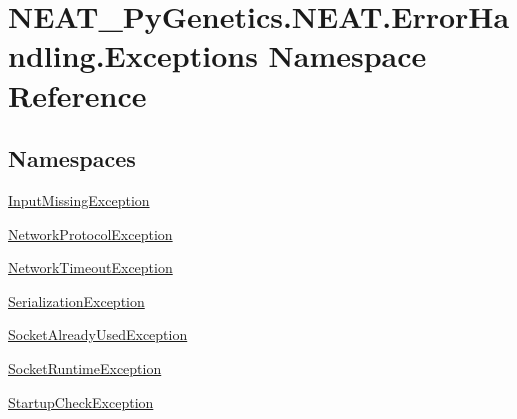 \hypertarget{namespaceNEAT__PyGenetics_1_1NEAT_1_1ErrorHandling_1_1Exceptions}{}\section{N\+E\+A\+T\+\_\+\+Py\+Genetics.\+N\+E\+A\+T.\+Error\+Handling.\+Exceptions Namespace Reference}
\label{namespaceNEAT__PyGenetics_1_1NEAT_1_1ErrorHandling_1_1Exceptions}
\subsection*{Namespaces}
\begin{DoxyCompactItemize}
\item 
 \hyperlink{namespaceNEAT__PyGenetics_1_1NEAT_1_1ErrorHandling_1_1Exceptions_1_1InputMissingException}{Input\+Missing\+Exception}
\item 
 \hyperlink{namespaceNEAT__PyGenetics_1_1NEAT_1_1ErrorHandling_1_1Exceptions_1_1NetworkProtocolException}{Network\+Protocol\+Exception}
\item 
 \hyperlink{namespaceNEAT__PyGenetics_1_1NEAT_1_1ErrorHandling_1_1Exceptions_1_1NetworkTimeoutException}{Network\+Timeout\+Exception}
\item 
 \hyperlink{namespaceNEAT__PyGenetics_1_1NEAT_1_1ErrorHandling_1_1Exceptions_1_1SerializationException}{Serialization\+Exception}
\item 
 \hyperlink{namespaceNEAT__PyGenetics_1_1NEAT_1_1ErrorHandling_1_1Exceptions_1_1SocketAlreadyUsedException}{Socket\+Already\+Used\+Exception}
\item 
 \hyperlink{namespaceNEAT__PyGenetics_1_1NEAT_1_1ErrorHandling_1_1Exceptions_1_1SocketRuntimeException}{Socket\+Runtime\+Exception}
\item 
 \hyperlink{namespaceNEAT__PyGenetics_1_1NEAT_1_1ErrorHandling_1_1Exceptions_1_1StartupCheckException}{Startup\+Check\+Exception}
\end{DoxyCompactItemize}
